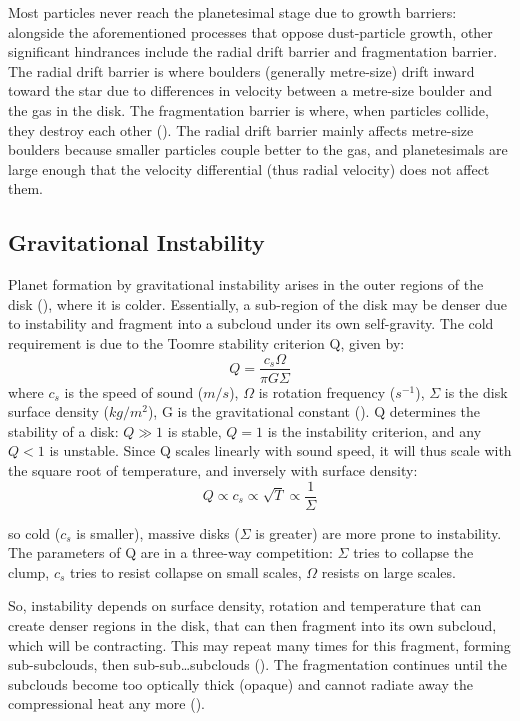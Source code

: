 \documentclass[11pt]{report}
\begin{document}
\begin{mainf}
Most particles never reach the planetesimal stage due to growth barriers: 
alongside the aforementioned processes that oppose dust-particle growth, other significant hindrances include the radial drift barrier and fragmentation barrier.
The radial drift barrier is where boulders (generally metre-size) drift inward toward the star due to differences in velocity between a metre-size boulder and the gas in the disk. 
The fragmentation barrier is where, when particles collide, they destroy each other (\citealp{Birnstiel2010,Birnstiel2016,Drazkowska2023}). 
The radial drift barrier mainly affects metre-size boulders because smaller particles couple better to the gas, and planetesimals are large enough that the velocity differential (thus radial velocity) does not affect them.


\subsection{Gravitational Instability}
\begin{sloppypar}
Planet formation by gravitational instability arises in the outer regions of the disk (\citealp{Dodson-Robinson2009}), where it is colder.
Essentially, a sub-region of the disk may be denser due to instability and fragment into a subcloud under its own self-gravity.
The cold requirement is due to the Toomre stability criterion Q, given by:
\[
Q = \frac{c_s\Omega}{\pi G \Sigma}
\]
where $c_s$ is the speed of sound ($m/s$), $\Omega$ is rotation frequency ($s^{-1}$), $\Sigma$ is the disk surface density ($kg/m^2$), G is the gravitational constant 
(\citealp{Toomre1964,Kratter2016,Longarini2026}). 
Q determines the stability of a disk: $Q \gg 1$ is stable, $Q = 1$ is the instability criterion, and any $Q < 1 $ is unstable.
Since Q scales linearly with sound speed, it will thus scale with the square root of temperature, and inversely with surface density:
\[
Q \propto c_s \propto \sqrt{T} \propto \frac{1}{\Sigma}
\]

so cold ($c_s$ is smaller), massive disks ($\Sigma$ is greater) are more prone to instability. The parameters of Q are in a three-way competition:
$\Sigma$ tries to collapse the clump, $c_s$ tries to resist collapse on small scales, $\Omega$ resists on large scales.
\end{sloppypar}
So, instability depends on surface density, rotation and temperature that can create denser regions in the disk, that can then fragment into its own subcloud, which will be contracting. 
This may repeat many times for this fragment, forming sub-subclouds, then sub-sub\dots subclouds (\citealp{Whitworth2006b}). The fragmentation continues until the subclouds become too optically thick (opaque) and cannot radiate away the compressional heat any more (\citealp{Whitworth2006a}).


\end{mainf}
\end{document}
